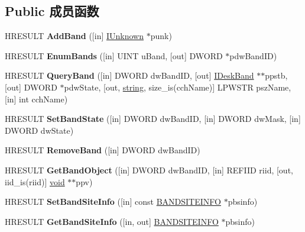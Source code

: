 \subsection*{Public 成员函数}
\begin{DoxyCompactItemize}
\item 
\mbox{\label{interface_i_band_site_a71cdf4bf334f5afbe46c1fc4d6fb6048}} 
H\+R\+E\+S\+U\+LT {\bfseries Add\+Band} (\mbox{[}in\mbox{]} \hyperlink{interface_i_unknown}{I\+Unknown} $\ast$punk)
\item 
\mbox{\label{interface_i_band_site_a4fc30900d27b5f098919c93acc2be37d}} 
H\+R\+E\+S\+U\+LT {\bfseries Enum\+Bands} (\mbox{[}in\mbox{]} U\+I\+NT u\+Band, \mbox{[}out\mbox{]} D\+W\+O\+RD $\ast$pdw\+Band\+ID)
\item 
\mbox{\label{interface_i_band_site_a63c24d9d4549b423311a183569ec2ddc}} 
H\+R\+E\+S\+U\+LT {\bfseries Query\+Band} (\mbox{[}in\mbox{]} D\+W\+O\+RD dw\+Band\+ID, \mbox{[}out\mbox{]} \hyperlink{interface_i_desk_band}{I\+Desk\+Band} $\ast$$\ast$ppstb, \mbox{[}out\mbox{]} D\+W\+O\+RD $\ast$pdw\+State, \mbox{[}out, \hyperlink{structstring}{string}, size\+\_\+is(cch\+Name)\mbox{]} L\+P\+W\+S\+TR psz\+Name, \mbox{[}in\mbox{]} int cch\+Name)
\item 
\mbox{\label{interface_i_band_site_ac3a8920a2aa191a2d88f65e239f8b1f9}} 
H\+R\+E\+S\+U\+LT {\bfseries Set\+Band\+State} (\mbox{[}in\mbox{]} D\+W\+O\+RD dw\+Band\+ID, \mbox{[}in\mbox{]} D\+W\+O\+RD dw\+Mask, \mbox{[}in\mbox{]} D\+W\+O\+RD dw\+State)
\item 
\mbox{\label{interface_i_band_site_afd5ae84925a07491cebd570775b41ad2}} 
H\+R\+E\+S\+U\+LT {\bfseries Remove\+Band} (\mbox{[}in\mbox{]} D\+W\+O\+RD dw\+Band\+ID)
\item 
\mbox{\label{interface_i_band_site_a69fe430a1a41af010e8f099e142879e0}} 
H\+R\+E\+S\+U\+LT {\bfseries Get\+Band\+Object} (\mbox{[}in\mbox{]} D\+W\+O\+RD dw\+Band\+ID, \mbox{[}in\mbox{]} R\+E\+F\+I\+ID riid, \mbox{[}out, iid\+\_\+is(riid)\mbox{]} \hyperlink{interfacevoid}{void} $\ast$$\ast$ppv)
\item 
\mbox{\label{interface_i_band_site_a6a9fc6ef4fc9ac6892186e4892cbb5cd}} 
H\+R\+E\+S\+U\+LT {\bfseries Set\+Band\+Site\+Info} (\mbox{[}in\mbox{]} const \hyperlink{structtag_b_a_n_d_s_i_t_e_i_n_f_o}{B\+A\+N\+D\+S\+I\+T\+E\+I\+N\+FO} $\ast$pbsinfo)
\item 
\mbox{\label{interface_i_band_site_aa061901e918f00a9216189b4d732dc49}} 
H\+R\+E\+S\+U\+LT {\bfseries Get\+Band\+Site\+Info} (\mbox{[}in, out\mbox{]} \hyperlink{structtag_b_a_n_d_s_i_t_e_i_n_f_o}{B\+A\+N\+D\+S\+I\+T\+E\+I\+N\+FO} $\ast$pbsinfo)
\end{DoxyCompactItemize}
